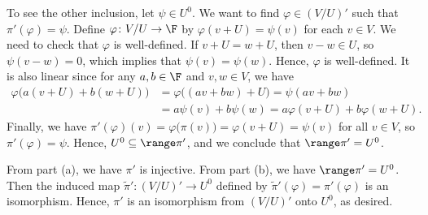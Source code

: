 \begin{exc}
\begin{solution}
\begin{parts}
  To see the other inclusion, let $\psi\in U^0$. We want to find
  $\varphi\in(V/U)'$ such that $\pi'(\varphi)=\psi$. Define
  $\varphi\colon V/U\to\F$ by $\varphi(v+U)=\psi(v)$ for each $v\in V$. We need
  to check that $\varphi$ is well-defined. If $v+U=w+U$, then $v-w\in U$, so
  $\psi(v-w)=0$, which implies that $\psi(v)=\psi(w)$. Hence, $\varphi$ is
  well-defined. It is also linear since for any $a,b\in\F$ and $v,w\in V$, we
  have
  \begin{align*}
  \varphi\bigl(a(v+U)+b(w+U)\bigr) &= \varphi\bigl((av+bw)+U\bigr)
    = \psi(av+bw)\\
   &= a\psi(v)+b\psi(w) = a\varphi(v+U)+b\varphi(w+U).
  \end{align*}
  Finally, we have
  $\pi'(\varphi)(v)=\varphi\bigl(\pi(v)\bigr)=\varphi(v+U)=\psi(v)$ for all
  $v\in V$, so $\pi'(\varphi)=\psi$. Hence, $U^0\subseteq\range\pi'$, and we
  conclude that $\range\pi'=U^0$.
\item From part (a), we have $\pi'$ is injective. From part (b), we have
  $\range\pi'=U^0$. Then the induced map $\tilde{\pi}'\colon(V/U)'\to U^0$
  defined by $\tilde{\pi}'(\varphi)=\pi'(\varphi)$ is an isomorphism. Hence,
  $\pi'$ is an isomorphism from $(V/U)'$ onto $U^0$, as desired.
\end{parts}
\end{solution}
\end{exc}
